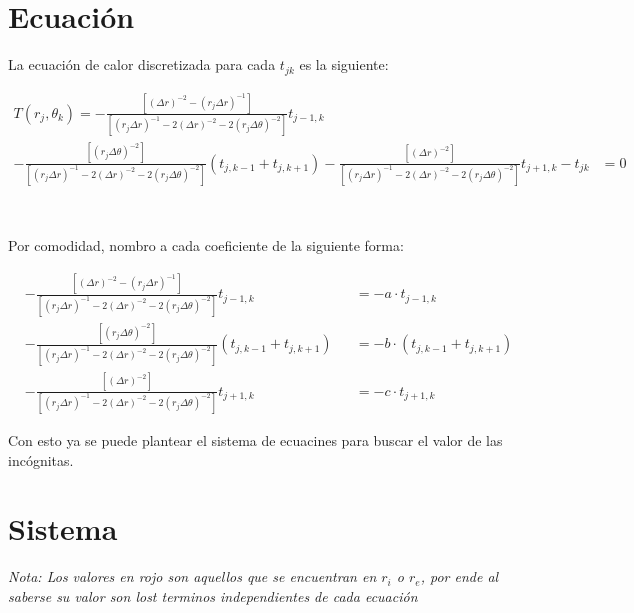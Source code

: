 \documentclass{article}
\begin{document}
\section*{Ecuación}

La ecuación de calor discretizada para cada $t_{jk}$ es la siguiente:

\begin{align*}
    T(r_j,\theta_k) =-\frac{[{(\Delta r)}^{-2} - {(r_j\Delta r)}^{-1}]}{[{(r_j\Delta r)}^{-1} - 2{(\Delta r)}^{-2} - 2{(r_{j}\Delta \theta)}^{-2}]}t_{j-1,k}
    & \\
    -\frac{[{(r_{j}\Delta \theta)}^{-2}]}{[{(r_j\Delta r)}^{-1} - 2{(\Delta r)}^{-2} - 2{(r_{j}\Delta \theta)}^{-2}]}(t_{j,k-1} + t_{j,k+1})
    -\frac{[{(\Delta r)}^{-2}]}{[{(r_j\Delta r)}^{-1} - 2{(\Delta r)}^{-2} - 2{(r_{j}\Delta \theta)}^{-2}]}t_{j+1,k}  - t_{jk} &= 0
\end{align*}

\

\noindent Por comodidad, nombro a cada coeficiente de la siguiente forma:

\begin{align*}
    &-\frac{[{(\Delta r)}^{-2} - {(r_j\Delta r)}^{-1}]}{[{(r_j\Delta r)}^{-1} - 2{(\Delta r)}^{-2} - 2{(r_{j}\Delta \theta)}^{-2}]}t_{j-1,k}& &= -a\cdot t_{j-1,k} \\
    &-\frac{[{(r_{j}\Delta \theta)}^{-2}]}{[{(r_j\Delta r)}^{-1} - 2{(\Delta r)}^{-2} - 2{(r_{j}\Delta \theta)}^{-2}]}(t_{j,k-1} + t_{j,k+1})& &= -b\cdot (t_{j,k-1} + t_{j,k+1}) \\
    &-\frac{[{(\Delta r)}^{-2}]}{[{(r_j\Delta r)}^{-1} - 2{(\Delta r)}^{-2} - 2{(r_{j}\Delta \theta)}^{-2}]}t_{j+1,k}& &= -c\cdot t_{j+1,k}
\end{align*}

\noindent Con esto ya se puede plantear el sistema de ecuacines para buscar el valor de las incógnitas.

\newpage

\section*{Sistema}

\emph{Nota: Los valores en rojo son aquellos que se encuentran en $r_i$ o $r_e$, por ende al saberse su valor son lost terminos independientes de cada ecuación}
\end{document}
